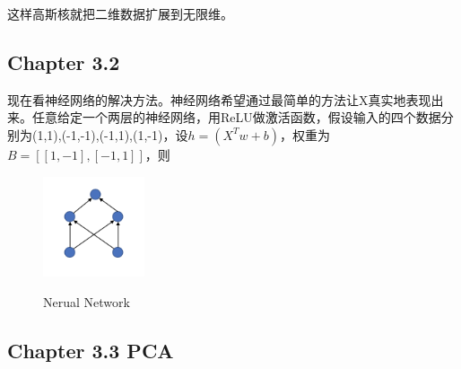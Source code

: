 \documentclass[12pt,UTF8,AutoFakeBold]{article}
\begin{document}
这样高斯核就把二维数据扩展到无限维。

\subsection{Chapter 3.2 }


现在看神经网络的解决方法。神经网络希望通过最简单的方法让X真实地表现出来。任意给定一个两层的神经网络，用ReLU做激活函数，假设输入的四个数据分别为{(1,1),(-1,-1),(-1,1),(1,-1)}，设$h=(X^Tw+b)$，权重为$B=[[1,-1],[-1,1]]$，则
\begin{figure}%
\includegraphics[width=3cm]{figs/Nerual Network.png}\\
\caption{Nerual Network}\label{fig5}
\end{figure}


\subsection{Chapter 3.3 PCA}
\end{document}
